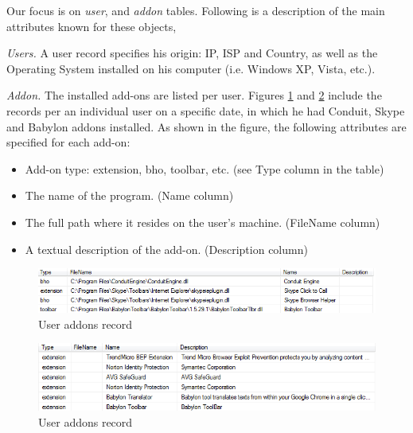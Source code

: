 \documentclass[11pt,oneside]{book}
\begin{document}
Our focus is on {\it user}, and {\it addon} tables. Following is a description of the main attributes known for these objects,

{\it Users.} A user record specifies his origin: IP, ISP and Country, as well as the Operating System installed on his computer (i.e. Windows XP, Vista, etc.).

{\it Addon.} The installed add-ons are listed per user. Figures \ref{fig:db_addons_snapshot} and \ref{fig:db_addons_snapshot_desc} include the records per an individual user on a specific date, in which he had Conduit, Skype and Babylon addons installed. As shown in the figure, the following attributes are specified for each add-on:
\begin{itemize}
\item Add-on type: extension, bho, toolbar, etc. (see Type column in the table)
\item The name of the program. (Name column)
\item The full path where it resides on the user's machine. (FileName column)
\item A textual description of the add-on. (Description column)
\end{itemize}

\begin{figure}[t]
\centering
\begin{small}
\includegraphics[scale=.8,angle=0]{figures/db_addons_snapshot.png}
\end{small}
\caption{User addons record}
\label{fig:db_addons_snapshot}
\end{figure}

\begin{figure}[t]
\centering
\begin{small}
\includegraphics[scale=.8,angle=0]{figures/db_addons_snapshot_desc.png}
\end{small}
\caption{User addons record}
\label{fig:db_addons_snapshot_desc}
\end{figure}
\end{document}
